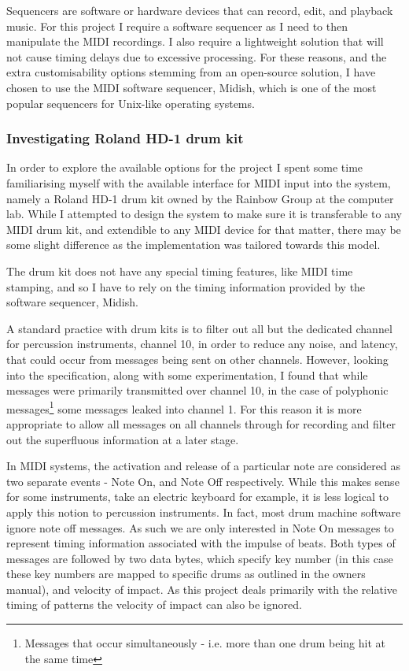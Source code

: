 \documentclass[12pt,twoside,notitlepage]{report}
\begin{document}
		Sequencers are software or hardware devices that can record, edit, and playback music. For this project I require a software sequencer as I need to then manipulate the MIDI recordings. I also require a lightweight solution that will not cause timing delays due to excessive processing. For these reasons, and the extra customisability options stemming from an open-source solution, I have chosen to use the MIDI software sequencer, Midish\footnotemark {}, which is one of the most popular sequencers for Unix-like operating systems.
		
		
		
			\subsubsection{Investigating Roland HD-1 drum kit}
			In order to explore the available options for the project I spent some time familiarising myself with the available interface for MIDI input into the system, namely a Roland HD-1 drum kit owned by the Rainbow Group at the computer lab. While I attempted to design the system to make sure it is transferable to any MIDI drum kit, and extendible to any MIDI device for that matter, there may be some slight difference as the implementation was tailored towards this model.

			The drum kit does not have any special timing features, like MIDI time stamping, and so I have to rely on the timing information provided by the software sequencer, Midish. 
			
			A standard practice with drum kits is to filter out all but the dedicated channel for percussion instruments, channel 10, in order to reduce any noise, and latency, that could occur from messages being sent on other channels. However, looking into the specification, along with some experimentation, I found that while messages were primarily transmitted over channel 10, in the case of polyphonic messages\footnote{Messages that occur simultaneously - i.e. more than one drum being hit at the same time} some messages leaked into channel 1. For this reason it is more appropriate to allow all messages on all channels through for recording and filter out the superfluous information at a later stage.			
			
			In MIDI systems, the activation and release of a particular note are considered as two separate events - Note On, and Note Off respectively. While this makes sense for some instruments, take an electric keyboard for example, it is less logical to apply this notion to percussion instruments. In fact, most drum machine software ignore note off messages. As such we are only interested in Note On messages to represent timing information associated with the impulse of beats. Both types of messages are followed by two data bytes, which specify key number (in this case these key numbers are mapped to specific drums as outlined in the owners manual\cite{Roland}), and velocity of impact. As this project deals primarily with the relative timing of patterns the velocity of impact can also be ignored.
			
\end{document}
